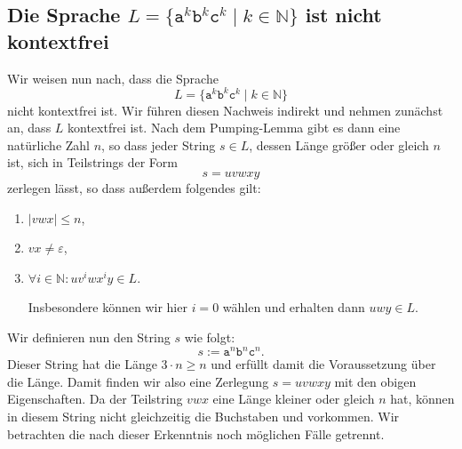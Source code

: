 \subsection{Die Sprache $L = \{ \mathtt{a}^k \mathtt{b}^k \mathtt{c}^k \mid k \in \mathbb{N} \}$ ist
nicht kontextfrei}
Wir weisen nun nach, dass die Sprache
\[ L = \{ \mathtt{a}^k \mathtt{b}^k \mathtt{c}^k \mid k \in \mathbb{N} \} \]
nicht kontextfrei ist.  Wir f\"uhren diesen Nachweis indirekt und nehmen zun\"achst an, dass $L$
kontextfrei ist.  Nach dem Pumping-Lemma gibt es dann eine nat\"urliche Zahl $n$, so dass jeder String
$s \in L$, dessen L\"ange gr\"o{\ss}er oder gleich $n$ ist, sich in Teilstrings der Form
\[ s = uvwxy \]
zerlegen l\"asst, so dass au{\ss}erdem folgendes gilt:
\begin{enumerate}
\item $|vwx| \leq n$,
\item $vx \not= \varepsilon$,
\item $\forall i \in \mathbb{N}: uv^iwx^iy \in L$.

      Insbesondere k\"onnen wir hier $i=0$ w\"ahlen und erhalten dann
      $uwy \in L$. 
\end{enumerate}
Wir definieren nun den String $s$ wie folgt:
\[ s := \mathtt{a}^n\mathtt{b}^n\mathtt{c}^n. \]
Dieser String hat die L\"ange $3 \cdot n \geq n$ und erf\"ullt damit die Voraussetzung \"uber die L\"ange.
Damit finden wir also eine Zerlegung $s=uvwxy$ mit den obigen Eigenschaften.  Da der Teilstring
$vwx$ eine L\"ange kleiner oder gleich $n$ hat, k\"onnen in diesem String nicht gleichzeitig die
Buchstaben  und  vorkommen. Wir betrachten die nach dieser Erkenntnis noch
m\"oglichen  F\"alle getrennt.
